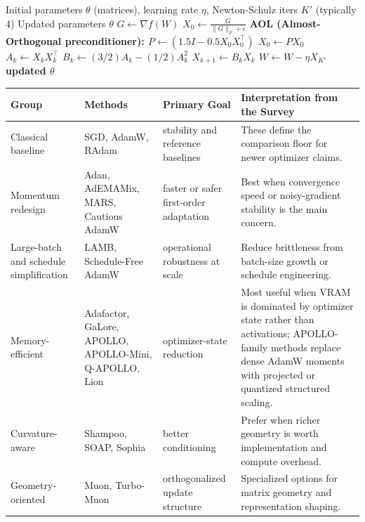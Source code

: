 \begin{algorithm}[H]
\caption{Turbo-Muon (AOL-Preconditioned Orthogonalization)}
\label{alg:turbo-muon}
\begin{algorithmic}[1]
\Require Initial parameters $\theta$ (matrices), learning rate $\eta$, Newton-Schulz iters $K'$ (typically 4)
\Ensure Updated parameters $\theta$
    \State $G \gets \nabla f(W)$ 
    \State $X_0 \gets \frac{G}{\|G\|_F + \epsilon}$ 
    \State \bf{AOL (Almost-Orthogonal preconditioner):} 
    \State $P \gets (1.5 I - 0.5 X_0 X_0^\top)$ 
    \State $X_0 \gets P X_0$ 
        \State $A_k \gets X_k X_k^\top$
        \State $B_k \gets (3/2) A_k - (1/2) A_k^2$
        \State $X_{k+1} \gets B_k X_k$ 
    \EndFor
    \State $W \gets W - \eta X_{K'}$ 
\EndFor
\Return updated $\theta$
\end{algorithmic}
\end{algorithm}

\small
\begin{longtable}{p{2.5cm}p{3.5cm}p{2.0cm}p{5.3cm}}
\toprule
\textbf{Group} & \textbf{Methods} & \textbf{Primary Goal} & \textbf{Interpretation from the Survey} \\
\midrule
\endhead
Classical baseline & SGD, AdamW, RAdam & stability and reference baselines & These define the comparison floor for newer optimizer claims. \\
Momentum redesign & Adan, AdEMAMix, MARS, Cautious AdamW & faster or safer first-order adaptation & Best when convergence speed or noisy-gradient stability is the main concern. \\
Large-batch and schedule simplification & LAMB, Schedule-Free AdamW & operational robustness at scale & Reduce brittleness from batch-size growth or schedule engineering. \\
Memory-efficient & Adafactor, GaLore, APOLLO, APOLLO-Mini, Q-APOLLO, Lion & optimizer-state reduction & Most useful when VRAM is dominated by optimizer state rather than activations; APOLLO-family methods replace dense AdamW moments with projected or quantized structured scaling. \\
Curvature-aware & Shampoo, SOAP, Sophia & better conditioning & Prefer when richer geometry is worth implementation and compute overhead. \\
Geometry-oriented & Muon, Turbo-Muon & orthogonalized update structure & Specialized options for matrix geometry and representation shaping. \\
\bottomrule
\end{longtable}
\normalsize

